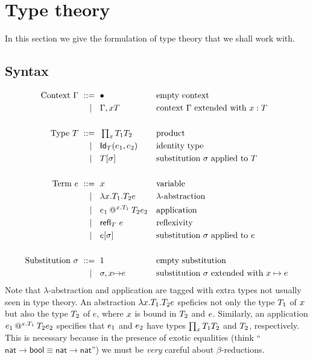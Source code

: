\section{Type theory}
\label{sec:type-theory}

In this section we give the formulation of type theory that we shall work with.

\subsection{Syntax}
\label{sec:syntax}

\begin{align*}
  \text{Context $\Gamma$}
    \ \mathrel{{:}{:}{=}}\    {}& \bullet                         && \text{empty context} \\
    \ \mid\ \  {}& \Gamma, x{T}            && \text{context $\Gamma$ extended with $x : T$} \\
  \\
  \text{Type $T$}
    \ \mathrel{{:}{:}{=}}\    {}& \mathop{\textstyle\prod_{x}}{T_1} T_2               && \text{product}\\
    \ \mid\ \  {}& \mathsf{Id}_{T}(e_1,e_2)               && \text{identity type} \\
    \ \mid\ \  {}& T[\sigma]                  && \text{substitution $\sigma$ applied to $T$} \\
  \\
  \text{Term $e$}
    \ \mathrel{{:}{:}{=}}\    {}& x                                && \text{variable} \\
    \ \mid\ \  {}& \lambda x . T_1 .{T_2} e           && \text{$\lambda$-abstraction} \\
    \ \mid\ \  {}& e_1\mathbin{@^{x.T_1}} T_2{e_2}  && \text{application} \\
    \ \mid\ \  {}& {\mathsf{refl}_{T}}\  e                      && \text{reflexivity} \\
    \ \mid\ \  {}& e[\sigma]                  && \text{substitution $\sigma$ applied to $e$} \\
  \\
  \text{Substitution $\sigma$}
    \ \mathrel{{:}{:}{=}}\    {}& 1                          && \text{empty substitution} \\
    \ \mid\ \  {}& \sigma,x{\mapsto}e           && \text{substitution $\sigma$ extended with $x \mapsto e$}
\end{align*}
%
Note that $\lambda$-abstraction and application are tagged with extra types not usually
seen in type theory. An abstraction $\lambda x . T_1 .{T_2} e$ speficies not only the type
$T_1$ of $x$ but also the type $T_2$ of $e$, where $x$ is bound in $T_2$ and $e$.
Similarly, an application $e_1\mathbin{@^{x.T_1}} T_2{e_2}$ specifies that $e_1$ and
$e_2$ have types $\mathop{\textstyle\prod_{x}}{T_1} T_2$ and $T_2$, respectively. This is necessary
because in the presence of exotic equalities (think ``$\mathsf{nat} \to \mathsf{bool}
\equiv \mathsf{nat} \to \mathsf{nat}$'') we must be \emph{very} careful about
$\beta$-reductions.

